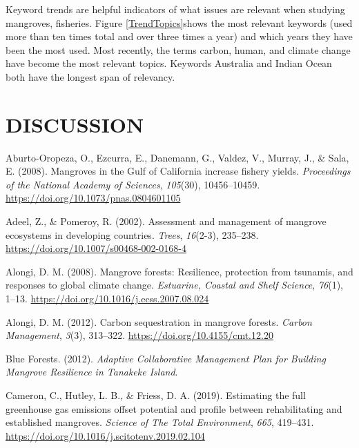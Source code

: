 \documentclass[
  12pt,
]{article}
\newlength{\cslhangindent}
\newlength{\cslentryspacingunit} %
\newenvironment{CSLReferences}[2] %
 {%
  \setlength{\parindent}{0pt}
  \ifodd #1
  \let\oldpar\par
  \def\par{\hangindent=\cslhangindent\oldpar}
  \fi
  \setlength{\parskip}{#2\cslentryspacingunit}
 }%
 {}
\begin{document}
Keyword trends are helpful indicators of what issues are relevant when studying mangroves, fisheries. Figure \ref{TrendTopics}shows the most relevant keywords (used more than ten times total and over three times a year) and which years they have been the most used. Most recently, the terms carbon, human, and climate change have become the most relevant topics. Keywords Australia and Indian Ocean both have the longest span of relevancy.

\hypertarget{discussion}{%
\section{DISCUSSION}\label{discussion}}

\newpage

\hypertarget{refs}{}
\begin{CSLReferences}{1}{2}
\leavevmode{}%
Aburto-Oropeza, O., Ezcurra, E., Danemann, G., Valdez, V., Murray, J., \& Sala, E. (2008). Mangroves in the {Gulf} of {California} increase fishery yields. \emph{Proceedings of the National Academy of Sciences}, \emph{105}(30), 10456--10459. \url{https://doi.org/10.1073/pnas.0804601105}

\leavevmode{}%
Adeel, Z., \& Pomeroy, R. (2002). Assessment and management of mangrove ecosystems in developing countries. \emph{Trees}, \emph{16}(2-3), 235--238. \url{https://doi.org/10.1007/s00468-002-0168-4}

\leavevmode{}%
Alongi, D. M. (2008). Mangrove forests: {Resilience}, protection from tsunamis, and responses to global climate change. \emph{Estuarine, Coastal and Shelf Science}, \emph{76}(1), 1--13. \url{https://doi.org/10.1016/j.ecss.2007.08.024}

\leavevmode{}%
Alongi, D. M. (2012). Carbon sequestration in mangrove forests. \emph{Carbon Management}, \emph{3}(3), 313--322. \url{https://doi.org/10.4155/cmt.12.20}

\leavevmode{}%
Blue Forests. (2012). \emph{Adaptive {Collaborative} {Management} {Plan} for {Building} {Mangrove} {Resilience} in {Tanakeke} {Island}}.

\leavevmode{}%
Cameron, C., Hutley, L. B., \& Friess, D. A. (2019). Estimating the full greenhouse gas emissions offset potential and profile between rehabilitating and established mangroves. \emph{Science of The Total Environment}, \emph{665}, 419--431. \url{https://doi.org/10.1016/j.scitotenv.2019.02.104}


\end{CSLReferences}
\end{document}
